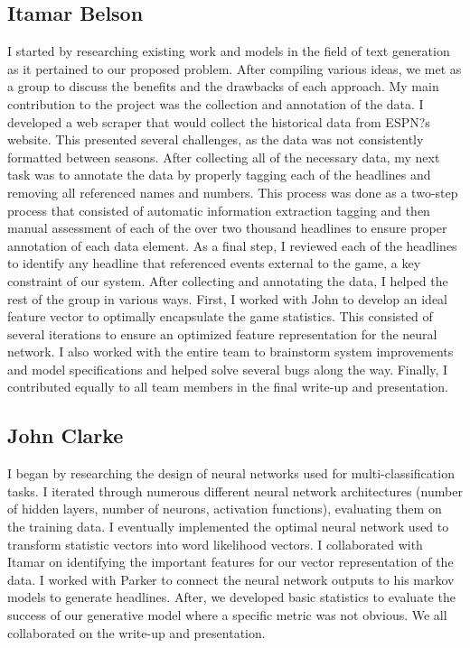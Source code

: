 \documentclass[12pt, journal]{IEEEtran}
\begin{document}
\subsection{Itamar Belson}
I started by researching existing work and models in the field of text generation as it pertained to our proposed problem. After compiling various ideas, we met as a group to discuss the benefits and the drawbacks of each approach. My main contribution to the project was the collection and annotation of the data. I developed a web scraper that would collect the historical data from ESPN?s website. This presented several challenges, as the data was not consistently formatted between seasons. After collecting all of the necessary data, my next task was to annotate the data by properly tagging each of the headlines and removing all referenced names and numbers. This process was done as a two-step process that consisted of automatic information extraction tagging and then manual assessment of each of the over two thousand headlines to ensure proper annotation of each data element. As a final step, I reviewed each of the headlines to identify any headline that referenced events external to the game, a key constraint of our system. After collecting and annotating the data, I helped the rest of the group in various ways. First, I worked with John to develop an ideal feature vector to optimally encapsulate the game statistics. This consisted of several iterations to ensure an optimized feature representation for the neural network. I also worked with the entire team to brainstorm system improvements and model specifications and helped solve several bugs along the way. Finally, I contributed equally to all team members in the final write-up and presentation.

\subsection{John Clarke}
I began by researching the design of neural networks used for multi-classification tasks. I iterated through numerous different neural network architectures (number of hidden layers, number of neurons, activation functions), evaluating them on the training data. I eventually implemented the optimal neural network used to transform statistic vectors into word likelihood vectors. I collaborated with Itamar on identifying the important features for our vector representation of the data. I worked with Parker to connect the neural network outputs to his markov models to generate headlines. After, we developed basic statistics to evaluate the success of our generative model where a specific metric was not obvious. We all collaborated on the write-up and presentation. 
\end{document}
